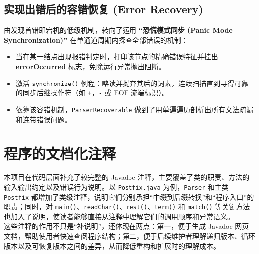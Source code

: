 \subsection{实现出错后的容错恢复 (Error Recovery)}
由发现首错即宕机的低级机制，转向了运用 \textbf{“恐慌模式同步 (Panic Mode Synchronization)”} 在单通道周期内探查全部错误的机制：
\begin{itemize}
  \item 当在某一结点出现报错判定时，打印该节点的精确错误特征并挂出 \textbf{errorOccurred} 标志，免除运行异常抛出阻断。
  \item 激活 \texttt{synchronize()} 例程：略读并抛弃其后的词素，连续扫描直到寻得可靠的同步后继操作符（如 \texttt{+}，\texttt{-} 或 EOF 流端标识）。
  \item 依靠该容错机制，\texttt{ParserRecoverable} 做到了用单遍遍历剖析出所有文法疏漏和连带错误问题。
\end{itemize}

\section{程序的文档化注释}
本项目在代码层面补充了较完整的 Javadoc 注释，主要覆盖了类的职责、方法的输入输出约定以及错误行为说明。以 \texttt{Postfix.java} 为例，\texttt{Parser} 和主类 \texttt{Postfix} 都增加了类级注释，说明它们分别承担“中缀到后缀转换”和“程序入口”的职责；同时，对 \texttt{main()}、\texttt{readChar()}、\texttt{rest()}、\texttt{term()} 和 \texttt{match()} 等关键方法也加入了说明，使读者能够直接从注释中理解它们的调用顺序和异常语义。\\
这些注释的作用不只是“补说明”，还体现在两点：第一，便于生成 Javadoc 网页文档，帮助使用者快速查阅程序结构；第二，便于后续维护者理解递归版本、循环版本以及可恢复版本之间的差异，从而降低重构和扩展时的理解成本。

